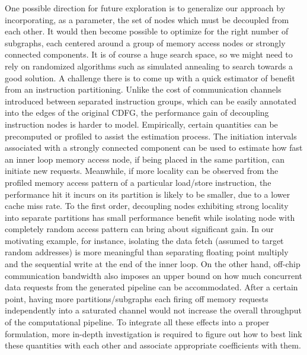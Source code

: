 One possible direction for future exploration is to generalize our approach by incorporating, as a parameter, the set
of nodes which must be decoupled from each other. It would then become possible to optimize for the right number of subgraphs, each centered around a group of memory access nodes or strongly connected components. It is of course a huge search space, so we might
need to rely on randomized algorithms such as simulated annealing to search towards
a good solution. A challenge there is to come up with a quick estimator of benefit from an instruction partitioning. Unlike the cost of communication channels introduced between separated instruction groups, which can be easily annotated into the edges of the original CDFG, the performance gain of decoupling instruction nodes is harder to model. Empirically, certain quantities can be precomputed or profiled to assist the estimation process. The initiation intervals associated with a strongly connected component can be used to estimate how fast an inner loop memory access node, if being placed in the same partition, can initiate new requests. Meanwhile, if more locality can be observed from the profiled memory access pattern of a particular load/store instruction, the performance hit it incurs on its partition is likely to be smaller, due to a lower cache miss rate.
To the first order, decoupling nodes exhibiting strong locality into separate partitions has small performance benefit while isolating node with completely random access pattern can bring about significant gain. In our
motivating example, for instance, isolating the data fetch (assumed to target random addresses) is more meaningful than separating floating point multiply and the sequential write at the end of the inner loop. On the other hand, 
off-chip communication bandwidth also imposes an upper bound on how much concurrent data
requests from the generated pipeline can be accommodated. After a certain point, having more partitions/subgraphs each firing off memory requests independently into a saturated channel would not increase the overall throughput of the computational pipeline. 
To integrate all these effects into a proper formulation, more in-depth investigation is required to figure out how to best link these quantities with each other and associate appropriate coefficients with them.




